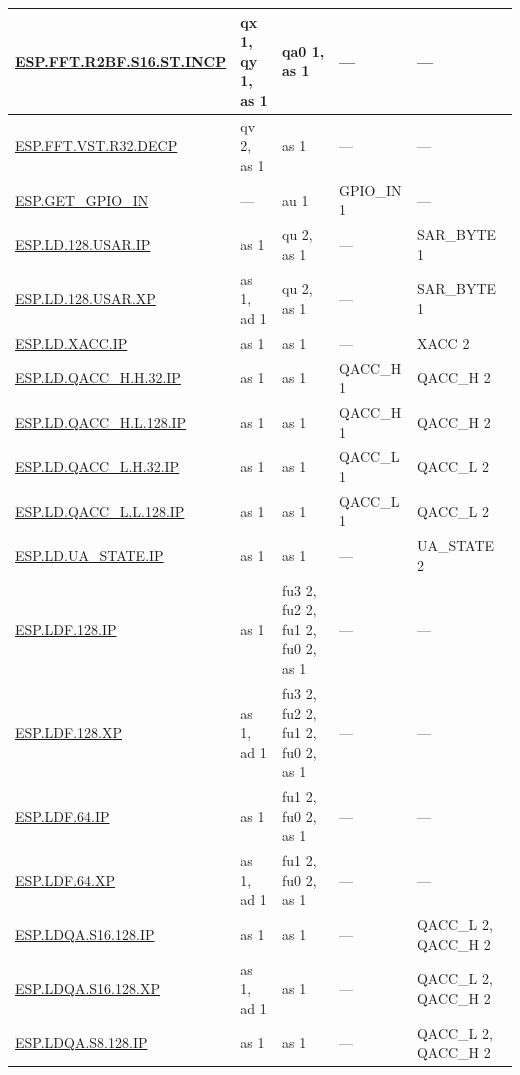 \begin{longtable}[c]{|l|m{2.5cm}|m{2.5cm}|m{2.5cm}|m{2.5cm}|}
    \hyperref[instruction:ESPFFTR2BFS16STINCP]{ESP.FFT.R2BF.S16.ST.INCP} & qx 1, qy 1, as 1 & qa0 1, as 1 & — & — \\\hline
    \hyperref[instruction:ESPFFTVSTR32DECP]{ESP.FFT.VST.R32.DECP} & qv 2, as 1 & as 1 & — & — \\\hline
    \hyperref[instruction:ESPGETGPIOIN]{ESP.GET\_GPIO\_IN} & — & au 1 & GPIO\_IN 1 & — \\\hline
    \hyperref[instruction:ESPLD128USARIP]{ESP.LD.128.USAR.IP} & as 1 & qu 2, as 1 & — & SAR\_BYTE 1\\\hline
    \hyperref[instruction:ESPLD128USARXP]{ESP.LD.128.USAR.XP} & as 1, ad 1 & qu 2, as 1 & — & SAR\_BYTE 1\\\hline
    \hyperref[instruction:ESPLDXACCIP]{ESP.LD.XACC.IP} & as 1 & as 1 & — & XACC 2\\\hline
    \hyperref[instruction:ESPLDQACCHH32IP]{ESP.LD.QACC\_H.H.32.IP} & as 1 & as 1 & QACC\_H 1 & QACC\_H 2\\\hline
    \hyperref[instruction:ESPLDQACCHL128IP]{ESP.LD.QACC\_H.L.128.IP} & as 1 & as 1 & QACC\_H 1 & QACC\_H 2\\\hline
    \hyperref[instruction:ESPLDQACCLH32IP]{ESP.LD.QACC\_L.H.32.IP} & as 1 & as 1 & QACC\_L 1 & QACC\_L 2\\\hline
    \hyperref[instruction:ESPLDQACCLL128IP]{ESP.LD.QACC\_L.L.128.IP} & as 1 & as 1 & QACC\_L 1 & QACC\_L 2\\\hline
    \hyperref[instruction:ESPLDUASTATEIP]{ESP.LD.UA\_STATE.IP} & as 1 & as 1 & — & UA\_STATE 2\\\hline
    \hyperref[instruction:ESPLDF128IP]{ESP.LDF.128.IP} & as 1 & fu3 2, fu2 2, fu1 2, fu0 2, as 1 & — & — \\\hline
    \hyperref[instruction:ESPLDF128XP]{ESP.LDF.128.XP} & as 1, ad 1 & fu3 2, fu2 2, fu1 2, fu0 2, as 1 & — & — \\\hline
    \hyperref[instruction:ESPLDF64IP]{ESP.LDF.64.IP} & as 1 & fu1 2, fu0 2, as 1 & — & — \\\hline
    \hyperref[instruction:ESPLDF64XP]{ESP.LDF.64.XP} & as 1, ad 1 & fu1 2, fu0 2, as 1 & — & — \\\hline
    \hyperref[instruction:ESPLDQAS16128IP]{ESP.LDQA.S16.128.IP} & as 1 & as 1 & — & QACC\_L 2, QACC\_H 2\\\hline
    \hyperref[instruction:ESPLDQAS16128XP]{ESP.LDQA.S16.128.XP} & as 1, ad 1 & as 1 & — & QACC\_L 2, QACC\_H 2\\\hline
    \hyperref[instruction:ESPLDQAS8128IP]{ESP.LDQA.S8.128.IP} & as 1 & as 1 & — & QACC\_L 2, QACC\_H 2\\\hline

\end{longtable}
